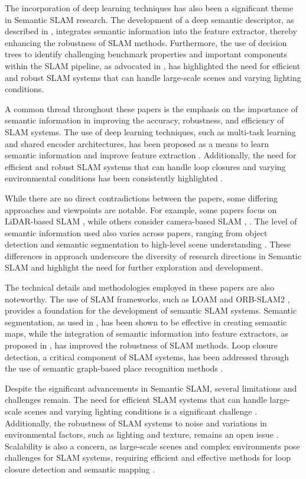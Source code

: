 \documentclass[conference]{IEEEtran}
\begin{document}
The incorporation of deep learning techniques has also been a significant theme in Semantic SLAM research. The development of a deep semantic descriptor, as described in \cite{b3}, integrates semantic information into the feature extractor, thereby enhancing the robustness of SLAM methods. Furthermore, the use of decision trees to identify challenging benchmark properties and important components within the SLAM pipeline, as advocated in \cite{b4}, has highlighted the need for efficient and robust SLAM systems that can handle large-scale scenes and varying lighting conditions.

A common thread throughout these papers is the emphasis on the importance of semantic information in improving the accuracy, robustness, and efficiency of SLAM systems. The use of deep learning techniques, such as multi-task learning and shared encoder architectures, has been proposed as a means to learn semantic information and improve feature extraction \cite{b5}. Additionally, the need for efficient and robust SLAM systems that can handle loop closures and varying environmental conditions has been consistently highlighted \cite{b6}.

While there are no direct contradictions between the papers, some differing approaches and viewpoints are notable. For example, some papers focus on LiDAR-based SLAM \cite{b1}, while others consider camera-based SLAM \cite{b2}, \cite{b3}. The level of semantic information used also varies across papers, ranging from object detection and semantic segmentation to high-level scene understanding \cite{b7}. These differences in approach underscore the diversity of research directions in Semantic SLAM and highlight the need for further exploration and development.

The technical details and methodologies employed in these papers are also noteworthy. The use of SLAM frameworks, such as LOAM \cite{b1} and ORB-SLAM2 \cite{b2}, provides a foundation for the development of semantic SLAM systems. Semantic segmentation, as used in \cite{b2}, has been shown to be effective in creating semantic maps, while the integration of semantic information into feature extractors, as proposed in \cite{b3}, has improved the robustness of SLAM methods. Loop closure detection, a critical component of SLAM systems, has been addressed through the use of semantic graph-based place recognition methods \cite{b1}.

Despite the significant advancements in Semantic SLAM, several limitations and challenges remain. The need for efficient SLAM systems that can handle large-scale scenes and varying lighting conditions is a significant challenge \cite{b6}. Additionally, the robustness of SLAM systems to noise and variations in environmental factors, such as lighting and texture, remains an open issue \cite{b8}. Scalability is also a concern, as large-scale scenes and complex environments pose challenges for SLAM systems, requiring efficient and effective methods for loop closure detection and semantic mapping \cite{b9}.
\end{document}
